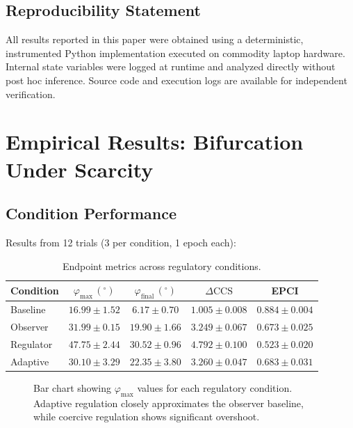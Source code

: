 \documentclass[12pt,a4paper]{article}
\theoremstyle{plain}
\theoremstyle{definition}
\theoremstyle{remark}
\begin{document}
\subsection{Reproducibility Statement}

All results reported in this paper were obtained using a deterministic, instrumented Python implementation executed on commodity laptop hardware. Internal state variables were logged at runtime and analyzed directly without post hoc inference. Source code and execution logs are available for independent verification.

\section{Empirical Results: Bifurcation Under Scarcity}

\subsection{Condition Performance}

Results from 12 trials (3 per condition, 1 epoch each):

\begin{table}[H]
\centering
\caption{Endpoint metrics across regulatory conditions.}
\begin{tabular}{lcccc}
\toprule
\textbf{Condition} &
$\varphi_{\max}\, (^\circ)$ &
$\varphi_{\mathrm{final}}\, (^\circ)$ &
$\Delta\mathrm{CCS}$ &
EPCI \\
\midrule
Baseline  & $16.99 \pm 1.52$ & $6.17 \pm 0.70$  & $1.005 \pm 0.008$ & $0.884 \pm 0.004$ \\
Observer  & $31.99 \pm 0.15$ & $19.90 \pm 1.66$ & $3.249 \pm 0.067$ & $0.673 \pm 0.025$ \\
Regulator & $47.75 \pm 2.44$ & $30.52 \pm 0.96$ & $4.792 \pm 0.100$ & $0.523 \pm 0.020$ \\
Adaptive  & $30.10 \pm 3.29$ & $22.35 \pm 3.80$ & $3.260 \pm 0.047$ & $0.683 \pm 0.031$ \\
\bottomrule
\end{tabular}
\end{table}

\begin{figure}[H]
\centering
{}
\caption{Bar chart showing $\varphi_{\max}$ values for each regulatory condition. Adaptive regulation closely approximates the observer baseline, while coercive regulation shows significant overshoot.}
\label{fig:phi_max}
\end{figure}
\end{document}
